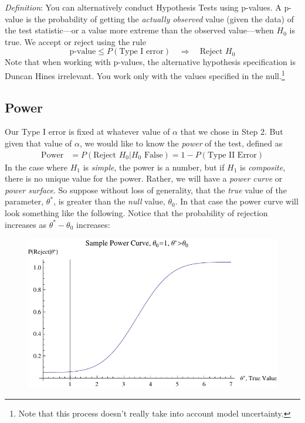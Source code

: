 \documentclass[a4paper,12pt]{scrartcl}
\begin{document}
{\sl Definition}: You can alternatively conduct Hypothesis Tests using
p-values. A p-value is the probability of getting the
\emph{actually observed} value (given the data) of the test
statistic---or a value more extreme than the observed value---when
$H_0$ is true. We accept or reject using the rule
\[ \text{p-value} \leq P(\text{Type I error}) \quad
   \Rightarrow \quad \text{Reject $H_0$} \]
Note that when working with p-values, the alternative hypothesis
specification is Duncan Hines irrelevant. You work only with the
values specified in the null.\footnote{Note that this process doesn't
really take into account model uncertainty.}


\subsection{Power}

Our Type I error is fixed at whatever value of $\alpha$ that we
chose in Step 2. But given that value of $\alpha$, we would like
to know the \emph{power} of the test, defined as
\begin{align*}
   \text{Power} &= P(\text{Reject $H_0$} | H_0 \text{ False})
   =1 - P(\text{Type II Error})
\end{align*}
In the case where $H_1$ is \emph{simple}, the
power is a number, but if $H_1$ is \emph{composite}, there is
no unique value for the power.  Rather, we will have a
\emph{power curve}
or \emph{power surface}. So suppose without loss
of generality, that the \emph{true} value of the parameter, $\theta^*$,
is greater than the \emph{null} value, $\theta_0$.
In that case the power curve
will look something like the following.
Notice that the probability of rejection increases as
$\theta^*-\theta_0$ increases:
\begin{figure}[h!]
   \centering
   \includegraphics[scale=0.7]{SamplePowerCurve.pdf}
\end{figure}
\end{document}
